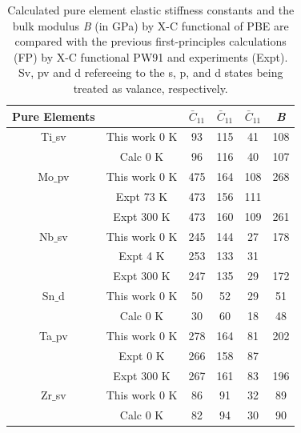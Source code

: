 \newpage
\begin{table}[H]
	\caption{Calculated pure element elastic stiffness constants and the bulk modulus \textit{B} (in GPa) by X-C functional of PBE are compared with the previous first-principles calculations (FP) by X-C functional PW91 and experiments (Expt). Sv, pv and d refereeing to the s, p, and d states being treated as valance, respectively.}
	\centering
	\begin{tabular}{ c c c c c c }
		\hline
		Pure Elements & & $\bar{C}_{11}$ & $\bar{C}_{11}$  & $\bar{C}_{11}$ & \textit{B}\\
		\hline
		Ti$\_$sv & This work 0 K & 93 & 115 & 41 & 108\\
		& Calc 0 K \cite{Shang2010b} & 96 & 116 & 40 & 107\\
		Mo$\_$pv & This work 0 K & 475 & 164 & 108 & 268\\
		& Expt 73 K \cite{Simmons1971b} & 473 & 156 & 111 &\\
		& Expt 300 K \cite{Dickinson1967a} & 473 & 160 & 109 & 261\\
		Nb$\_$sv & This work 0 K & 245 & 144 & 27 & 178\\
		& Expt 4 K \cite{Simmons1971b} & 253 & 133 & 31 & \\
		& Expt 300 K \cite{Bolef1961} & 247 & 135 & 29 & 172\\
		Sn$\_$d & This work 0 K & 50 & 52 & 29 & 51\\
		& Calc 0 K \cite{Shang2010b} & 30 & 60 & 18 & 48\\
		Ta$\_$pv & This work 0 K & 278 & 164 & 81 & 202\\
		& Expt 0 K \cite{Simmons1971b} & 266 & 158 & 87 & \\
		& Expt 300 K \cite{Bolef1961} & 267 & 161 & 83 & 196\\
		Zr$\_$sv & This work 0 K & 86 & 91 & 32 & 89\\
		& Calc 0 K \cite{Shang2010b} & 82 & 94 & 30 & 90\\
		\hline
	\end{tabular}
	\label{Ch5-table:pureeleelas}
\end{table}
\clearpage


